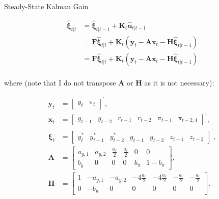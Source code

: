 \documentclass[a4paper,12pt]{article}
\begin{document}
\bigskip 

Steady-State Kalman Gain

\begin{align*}
\boldsymbol{\hat{\xi}}_{t|t}& =\boldsymbol{\hat{\xi}}_{t|t-1}+\mathbf{K}_{t}%
\mathbf{\hat{u}}_{t|t-1} \\
& =\mathbf{F}\boldsymbol{\hat{\xi}}_{t|t}+\mathbf{K}_{t}\left( \mathbf{y}%
_{t}-\mathbf{Ax}_{t}-\mathbf{H}\boldsymbol{\hat{\xi}}_{t|t-1}\right)  \\
& =\mathbf{F}\boldsymbol{\hat{\xi}}_{t|t}+\mathbf{K}_{t}\left( \mathbf{y}%
_{t}-\mathbf{Ax}_{t}-\mathbf{H}\boldsymbol{\hat{\xi}}_{t|t-1}\right)  \\
&
\end{align*}

\bigskip 

\bigskip where (note that I do not transpose $\mathbf{A}$ or $\mathbf{H}$ as
it is not necessary):

\begin{align*}
\mathbf{y}_{t}& = 
\begin{bmatrix}
y_{t} & \pi _{t}%
\end{bmatrix}
^{\prime }, \\
\mathbf{x}_{t}& = 
\begin{bmatrix}
y_{t-1} & y_{t-2} & r_{t-1} & r_{t-2} & \pi _{t-1} & \pi _{t-2,4}%
\end{bmatrix}
^{\prime }, \\
\boldsymbol{\xi }_{t}& = 
\begin{bmatrix}
y_{t}^{\ast } & y_{t-1}^{\ast } & y_{t-2}^{\ast } & g_{t-1} & g_{t-2} & 
z_{t-1} & z_{t-2}%
\end{bmatrix}
^{\prime }, \\
\mathbf{A}& = 
\begin{bmatrix}
a_{y,1} & a_{y,2} & \frac{a_{r}}{2} & \frac{a_{r}}{2} & 0 & 0 \\ 
b_{y} & 0 & 0 & 0 & b_{\pi } & 1-b_{\pi }%
\end{bmatrix}
, \\
\mathbf{H}& = 
\begin{bmatrix}
1 & -a_{y,1} & -a_{y,2} & -4\frac{a_{r}}{2} & -4\frac{a_{r}}{2} & -\frac{
a_{r}}{2} & -\frac{a_{r}}{2} \\ 
0 & -b_{y} & 0 & 0 & 0 & 0 & 0%
\end{bmatrix}
.
\end{align*}

\bigskip

\bigskip

\bigskip
\end{document}
